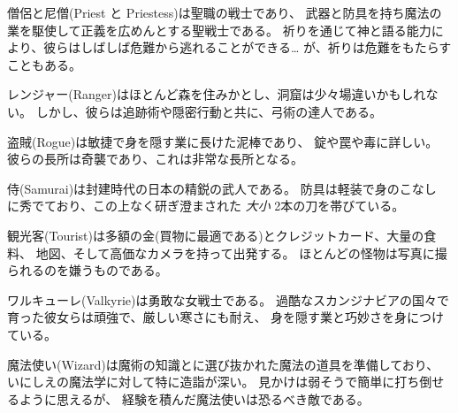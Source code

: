 \item[\bb{Priests} and {\bb Priestesses}]
僧侶と尼僧(Priest と Priestess)は聖職の戦士であり、
武器と防具を持ち魔法の業を駆使して正義を広めんとする聖戦士である。
祈りを通じて神と語る能力により、彼らはしばしば危難から逃れることができる…
が、祈りは危難をもたらすこともある。
\item[\bb{Rangers}]%
レンジャー(Ranger)はほとんど森を住みかとし、洞窟は少々場違いかもしれない。
しかし、彼らは追跡術や隠密行動と共に、弓術の達人である。
\item[\bb{Rogues}]%
盗賊(Rogue)は敏捷で身を隠す業に長けた泥棒であり、
錠や罠や毒に詳しい。
彼らの長所は奇襲であり、これは非常な長所となる。
\item[\bb{Samurai}]%
侍(Samurai)は封建時代の日本の精鋭の武人である。
防具は軽装で身のこなし
に秀でており、この上なく研ぎ澄まされた {\it 大小 } 2本の刀を帯びている。
\item[\bb{Tourists}]%
観光客(Tourist)は多額の金(買物に最適である)とクレジットカード、大量の食料、
地図、そして高価なカメラを持って出発する。
ほとんどの怪物は写真に撮られるのを嫌うものである。
\item[\bb{Valkyries}]%
ワルキューレ(Valkyrie)は勇敢な女戦士である。
過酷なスカンジナビアの国々で育った彼女らは頑強で、厳しい寒さにも耐え、
身を隠す業と巧妙さを身につけている。
\item[\bb{Wizards}]%
魔法使い(Wizard)は魔術の知識とに選び抜かれた魔法の道具を準備しており、
いにしえの魔法学に対して特に造詣が深い。
見かけは弱そうで簡単に打ち倒せるように思えるが、
経験を積んだ魔法使いは恐るべき敵である。
\elist

